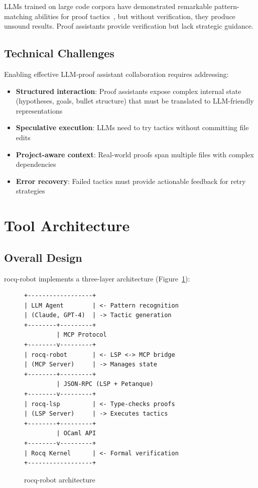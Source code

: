 \documentclass[sigconf,screen,nonacm]{acmart}
\begin{document}
LLMs trained on large code corpora have demonstrated remarkable pattern-matching abilities for proof tactics~\cite{first2023baldur,yang2023leandojo}, but without verification, they produce unsound results. Proof assistants provide verification but lack strategic guidance.

\subsection{Technical Challenges}

Enabling effective LLM-proof assistant collaboration requires addressing:

\begin{itemize}
\item \textbf{Structured interaction}: Proof assistants expose complex internal state (hypotheses, goals, bullet structure) that must be translated to LLM-friendly representations
\item \textbf{Speculative execution}: LLMs need to try tactics without committing file edits
\item \textbf{Project-aware context}: Real-world proofs span multiple files with complex dependencies
\item \textbf{Error recovery}: Failed tactics must provide actionable feedback for retry strategies
\end{itemize}

\section{Tool Architecture}

\subsection{Overall Design}

rocq-robot implements a three-layer architecture (Figure~\ref{fig:arch}):

\begin{figure}[t]
\small
\begin{verbatim}
+------------------+
| LLM Agent        | <- Pattern recognition
| (Claude, GPT-4)  | -> Tactic generation
+--------+---------+
         | MCP Protocol
+--------v---------+
| rocq-robot       | <- LSP <-> MCP bridge
| (MCP Server)     | -> Manages state
+--------+---------+
         | JSON-RPC (LSP + Petanque)
+--------v---------+
| rocq-lsp         | <- Type-checks proofs
| (LSP Server)     | -> Executes tactics
+--------+---------+
         | OCaml API
+--------v---------+
| Rocq Kernel      | <- Formal verification
+------------------+
\end{verbatim}
\caption{rocq-robot architecture}
\label{fig:arch}
\end{figure}
\end{document}
